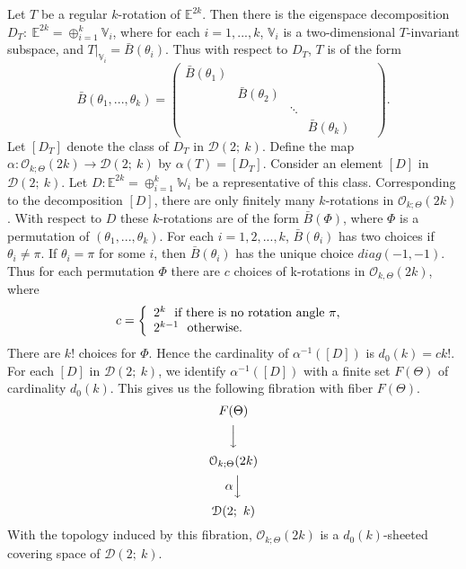 \documentclass[11pt]{amsart}
\theoremstyle{definition}
\theoremstyle{remark}
\numberwithin{equation}{section}
\theoremstyle{plain}
\begin{document}
Let $T$ be a regular $k$-rotation of ${\mathbb E}^{2k}$. Then there is the eigenspace decomposition $D_T: \ {\mathbb E}^{2k}=\oplus_{i=1}^k {{\mathbb V}_i}$, where for each $i=1,...,k$, ${\mathbb V}_i$ is a two-dimensional  $T$-invariant subspace, and  \hbox{$T|_{{\mathbb V}_i}=\bar B(\theta_i)$}.  Thus with respect to $D_T$,  $T$ is of the form
$$\bar B(\theta_1,...,\theta_k)=\begin{pmatrix}\bar B(\theta_1) &  &  &  & \\ & \bar B(\theta_2) &  &  &  &  \\ & & \ddots & & \\ &  & & \bar B(\theta_k)  \end{pmatrix}.$$
Let $[D_T]$ denote the class of $D_T$ in ${\mathcal D}(2; \ k)$. Define the map $\alpha: {\mathcal O}_{k;\Theta}(2k) \to  {\mathcal D}(2; \ k)$ by \hbox{$\alpha( T)=[D_T]$}.
Consider an element  $[D]$ in ${\mathcal D}(2; \ k)$. Let $D: {\mathbb E}^{2k}=\oplus_{i=1}^k {\mathbb W}_i$ be a representative of this class.  Corresponding to the decomposition $[D]$, there are only  finitely many $k$-rotations in ${\mathcal O}_{k;\Theta}(2k)$. With respect to $D$ these $k$-rotations are of the form $\bar B(\Phi)$, where $\Phi$ is a permutation of 
$(\theta_1 , ..., \theta_k)$. For each $i = 1, 2, ..., k$, $\bar B(\theta_i )$ has two choices if $\theta_i \neq \pi$. If $\theta_i=\pi$ for some $i$, then $\bar B(\theta_i)$  has the unique choice $diag(-1, -1)$. Thus for each  permutation $\Phi$ there are
$c$ choices of k-rotations in ${\mathcal O}_{k,\Theta}(2k)$, where
$$c=\left \{ \begin{array}{ll} 2^{k} \ \hbox{ if  there is no rotation angle $\pi$, }\\
              2^{k-1} \ \hbox{ otherwise.}
             \end{array}\right.$$
There are $k!$ choices for $\Phi$. Hence the cardinality of $\alpha^{-1} ([D])$ is $d_0(k)=c k!$. 
For each $[D]$ in ${\mathcal D}(2; \  k)$, we identify $\alpha^{-1} ([D])$ with a finite set $F (\Theta)$ of cardinality $d_0(k)$. This gives us the following fibration with fiber $F (\Theta)$. 
$$\begin{CD}
F(\Theta) \\
@VVV \\
{\mathcal O}_{k;\Theta}(2k)\\
{\alpha}@VVV\\
 {\mathcal D}(2; \ k)
\end{CD}$$
With the topology induced by this fibration,  ${\mathcal O}_{k;\Theta}(2k)$ is a $d_0(k)$-sheeted covering space of ${\mathcal D}(2; \ k)$. 
\end{document}
